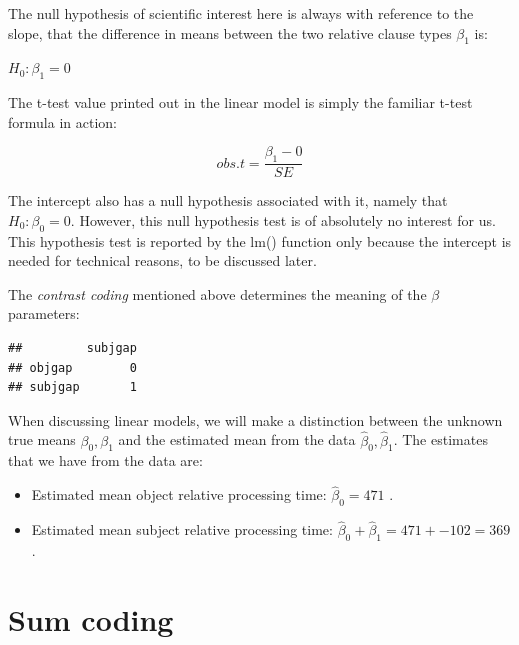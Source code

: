 \documentclass[12pt,]{krantz}
\newenvironment{Shaded}{\begin{snugshade}}{\end{snugshade}}
\newcommand{\DataTypeTok}[1]{\textcolor[rgb]{0.13,0.29,0.53}{#1}}
\newcommand{\KeywordTok}[1]{\textcolor[rgb]{0.13,0.29,0.53}{\textbf{#1}}}
\newcommand{\NormalTok}[1]{#1}
\newcommand{\OperatorTok}[1]{\textcolor[rgb]{0.81,0.36,0.00}{\textbf{#1}}}
\newcommand{\StringTok}[1]{\textcolor[rgb]{0.31,0.60,0.02}{#1}}
\providecommand{\tightlist}{%
  \setlength{\itemsep}{0pt}\setlength{\parskip}{0pt}}
\begin{document}
The null hypothesis of scientific interest here is always with reference to the slope, that the difference in means between the two relative clause types \(\beta_1\) is:

\(H_0: \beta_1 = 0\)

The t-test value printed out in the linear model is simply the familiar t-test formula in action:

\begin{equation}
obs.t = \frac{\beta_1 - 0}{SE}
\end{equation}

The intercept also has a null hypothesis associated with it, namely that
\(H_0: \beta_0 = 0\). However, this null hypothesis test is of absolutely no interest for us. This hypothesis test is reported by the lm() function only because the intercept is needed for technical reasons, to be discussed later.

The \emph{contrast coding} mentioned above determines the meaning of the \(\beta\) parameters:

\begin{Shaded}
\end{Shaded}

\begin{verbatim}
##         subjgap
## objgap        0
## subjgap       1
\end{verbatim}

When discussing linear models, we will make a distinction between the unknown true means \(\beta_0, \beta_1\) and the estimated mean from the data \(\hat\beta_0, \hat\beta_1\). The estimates that we have from the data are:

\begin{itemize}
\tightlist
\item
  Estimated mean object relative processing time: \(\hat\beta_0=471\)
  .
\item
  Estimated mean subject relative processing time: \(\hat\beta_0+\hat\beta_1=471+-102=369\).
\end{itemize}

\hypertarget{sum-coding}{%
\section{Sum coding}\label{sum-coding}}
\end{document}

